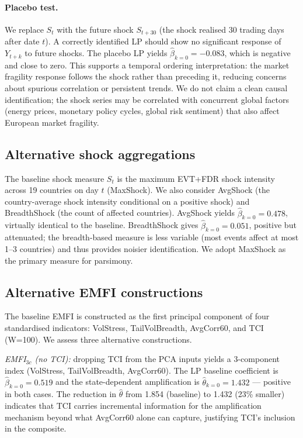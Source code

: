 \documentclass[11pt]{article}
\begin{document}
\paragraph{Placebo test.}
We replace $S_t$ with the future shock $S_{t+30}$ (the shock realised 30 trading days
after date $t$). A correctly identified LP should show no significant response of
$Y_{t+k}$ to future shocks. The placebo LP yields $\hat\beta_{k=0} = -0.083$,
which is negative and close to zero. This supports a temporal ordering interpretation: the market fragility
response follows the shock rather than preceding it, reducing concerns
about spurious correlation or persistent trends. We do not claim a clean
causal identification; the shock series may be correlated with concurrent
global factors (energy prices, monetary policy cycles, global risk
sentiment) that also affect European market fragility.

\subsection{Alternative shock aggregations}
\label{sec:rob_shock}

The baseline shock measure $S_t$ is the maximum EVT+FDR shock intensity across 19
countries on day $t$ (MaxShock). We also consider AvgShock (the country-average
shock intensity conditional on a positive shock) and BreadthShock (the count of
affected countries). AvgShock yields $\hat\beta_{k=0} = 0.478$, virtually identical
to the baseline. BreadthShock gives $\hat\beta_{k=0} = 0.051$, positive but attenuated;
the breadth-based measure is less variable (most events affect at most 1--3 countries)
and thus provides noisier identification. We adopt MaxShock as the primary measure for
parsimony.

\subsection{Alternative EMFI constructions}
\label{sec:rob_emfi}

The baseline EMFI is constructed as the first principal component of four standardised
indicators: VolStress, TailVolBreadth, AvgCorr60, and TCI (W=100). We assess three
alternative constructions.

\textit{EMFI$_{3c}$ (no TCI):} dropping TCI from the PCA inputs yields a 3-component
index (VolStress, TailVolBreadth, AvgCorr60). The LP baseline coefficient is
$\hat\beta_{k=0} = 0.519$ and the state-dependent amplification is $\hat\theta_{k=0}
= 1.432$ --- positive in both cases. The reduction in $\hat\theta$ from 1.854 (baseline)
to 1.432 (23\% smaller) indicates that TCI carries incremental information for the
amplification mechanism beyond what AvgCorr60 alone can capture, justifying TCI's
inclusion in the composite.
\end{document}
